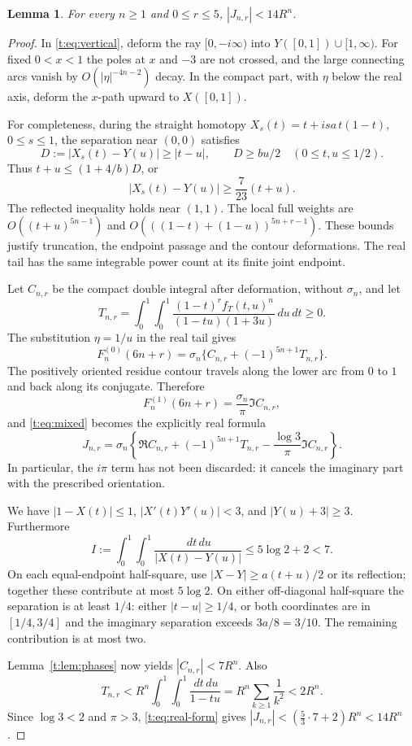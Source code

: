 \documentclass[11pt]{amsart}
\newcommand{\dd}{\,d}
\theoremstyle{plain}
\newtheorem{lemma}[theorem]{Lemma}
\theoremstyle{remark}\newtheorem{remark}[theorem]{Remark}
\numberwithin{equation}{section}
\begin{document}
\begin{lemma}\label{t:lem:bound}
For every $n\ge1$ and $0\le r\le5$, $|J_{n,r}|<14R^n$.
\end{lemma}
\begin{proof}
In \eqref{t:eq:vertical}, deform the ray $[0,-i\infty)$ into
$Y([0,1])\cup[1,\infty)$. For fixed $0<x<1$ the poles at $x$ and $-3$
are not crossed, and the large connecting arcs vanish by
$O(|\eta|^{-4n-2})$ decay. In the compact part, with $\eta$ below the real
axis, deform the $x$-path upward to $X([0,1])$.

For completeness, during the straight homotopy
$X_s(t)=t+isa\,t(1-t)$, $0\le s\le1$, the separation near $(0,0)$ satisfies
\[
 D:=|X_s(t)-Y(u)|\ge|t-u|,\qquad D\ge bu/2
 \quad(0\le t,u\le1/2).
\]
Thus $t+u\le(1+4/b)D$, or
\begin{equation}\label{t:eq:separation}
 |X_s(t)-Y(u)|\ge\frac7{23}(t+u).
\end{equation}
The reflected inequality holds near $(1,1)$. The local full weights are
$O((t+u)^{5n-1})$ and
$O(((1-t)+(1-u))^{5n+r-1})$. These bounds justify truncation, the
endpoint passage and the contour deformations. The real tail has the same
integrable power count at its finite joint endpoint.

Let $C_{n,r}$ be the compact double integral after deformation, without
$\sigma_n$, and let
\[
 T_{n,r}=\int_0^1\!\int_0^1
 \frac{(1-t)^r f_T(t,u)^n}{(1-tu)(1+3u)}\dd u\dd t\ge0.
\]
The substitution $\eta=1/u$ in the real tail gives
\begin{equation}\label{t:eq:split}
 F_n^{(0)}(6n+r)=\sigma_n\{C_{n,r}+(-1)^{5n+1}T_{n,r}\}.
\end{equation}
The positively oriented residue contour travels along the lower arc from
$0$ to $1$ and back along its conjugate. Therefore
\[
 F_n^{(1)}(6n+r)=\frac{\sigma_n}{\pi}\Im C_{n,r},
\]
and \eqref{t:eq:mixed} becomes the explicitly real formula
\begin{equation}\label{t:eq:real-form}
 J_{n,r}=\sigma_n\left\{\Re C_{n,r}+(-1)^{5n+1}T_{n,r}
               -\frac{\log3}{\pi}\Im C_{n,r}\right\}.
\end{equation}
In particular, the $i\pi$ term has not been discarded: it cancels the
imaginary part with the prescribed orientation.

We have $|1-X(t)|\le1$, $|X'(t)Y'(u)|<3$, and $|Y(u)+3|\ge3$.
Furthermore
\[
 I:=\int_0^1\!\int_0^1\frac{\dd t\dd u}{|X(t)-Y(u)|}
 \le5\log2+2<7.
\]
On each equal-endpoint half-square, use
$|X-Y|\ge a(t+u)/2$ or its reflection; together these contribute at most
$5\log2$. On either off-diagonal half-square the separation is at least
$1/4$: either $|t-u|\ge1/4$, or both coordinates are in $[1/4,3/4]$ and
the imaginary separation exceeds $3a/8=3/10$. The remaining contribution
is at most two.

Lemma~\ref{t:lem:phases} now yields $|C_{n,r}|<7R^n$. Also
\[
 T_{n,r}<R^n\int_0^1\!\int_0^1\frac{\dd t\dd u}{1-tu}
 =R^n\sum_{k\ge1}\frac1{k^2}<2R^n.
\]
Since $\log3<2$ and $\pi>3$, \eqref{t:eq:real-form} gives
$|J_{n,r}|<(\frac53\cdot7+2)R^n<14R^n$.
\end{proof}
\end{document}
